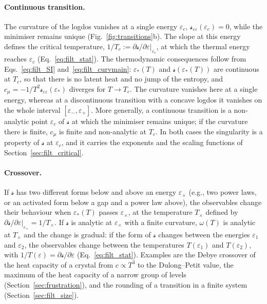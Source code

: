 \documentclass[10pt,a4paper]{article}
\theoremstyle{plain}
\newcommand{\lndos}{{logdos}}  %
\newcommand{\lds}{\mathscr{s}}  %
\begin{document}
\paragraph{Continuous transition.} The curvature of the \lndos{} vanishes at
a single energy $\varepsilon_c$,
$\lds_{\varepsilon\varepsilon}(\varepsilon_c)=0$, while the minimiser remains
unique (Fig.~\ref{fig:transitions}b). The slope at this energy defines the
critical temperature,
$1/T_c:=\partial\lds/\partial\varepsilon|_{\varepsilon_c}$, at which the
thermal energy reaches $\varepsilon_c$ (Eq.~\eqref{eq:filt_stat}). The
thermodynamic consequences follow from Eqs.~\eqref{eq:filt_SI}
and~\eqref{eq:filt_curvmain}: $\varepsilon_*(T)$ and
$\lds(\varepsilon_*(T))$ are continuous at $T_c$, so that there is no latent
heat and no jump of the entropy, and
$c_\mu=-1/T^{2}\lds_{\varepsilon\varepsilon}(\varepsilon_*)$ diverges for
$T\to T_c$. The curvature vanishes here at a single energy, whereas at a
discontinuous transition with a concave \lndos{} it vanishes on the whole
interval $[\varepsilon_-,\varepsilon_+]$. More generally, a continuous
transition is a non-analytic point $\varepsilon_c$ of $\lds$ at which the
minimiser remains unique; if the curvature there is finite, $c_\mu$ is
finite and non-analytic at $T_c$. In both cases the singularity is a
property of $\lds$ at $\varepsilon_c$, and it carries the exponents and the
scaling functions of Section~\ref{sec:filt_critical}.

\paragraph{Crossover.} If $\lds$ has two different forms below and above an
energy $\varepsilon_\times$ (e.g., two power laws, or an activated form below a
gap and a power law above), the observables change their behaviour when
$\varepsilon_*(T)$ passes $\varepsilon_\times$, at the temperature $T_\times$
defined by
$\partial \lds/\partial\varepsilon|_{\varepsilon_\times}=1/T_\times$. If $\lds$
is analytic at $\varepsilon_\times$ with a finite curvature, $\omega(T)$ is
analytic at $T_\times$ and the change is gradual: if the form of $\lds$
changes between the energies $\varepsilon_1$ and $\varepsilon_2$, the
observables change between the temperatures $T(\varepsilon_1)$ and
$T(\varepsilon_2)$, with $1/T(\varepsilon)=\partial\lds/\partial\varepsilon$
(Eq.~\eqref{eq:filt_stat}). Examples are the Debye crossover of
the heat capacity of a crystal from $c\propto T^{3}$ to the Dulong--Petit
value, the maximum of the heat capacity of a narrow group of levels
(Section~\ref{sec:frustration}), and the rounding of a transition in a
finite system (Section~\ref{sec:filt_size}).
\end{document}
